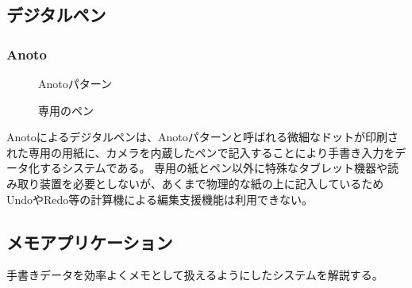 \subsection{デジタルペン}

\subsubsection{Anoto}

\begin{figure}[htbp] \begin{minipage}{0.5\hsize}
                         \begin{center} 
                         \end{center} \caption{Anotoパターン} \label{fig:anoto1}
\end{minipage} \begin{minipage}{0.5\hsize}
                   \begin{center} 
                   \end{center} \caption{専用のペン} \label{fig:anoto2}
\end{minipage}
\end{figure}

Anotoによるデジタルペンは、Anotoパターンと呼ばれる微細なドットが印刷された専用の用紙に、カメラを内蔵したペンで記入することにより手書き入力をデータ化するシステムである。
専用の紙とペン以外に特殊なタブレット機器や読み取り装置を必要としないが、あくまで物理的な紙の上に記入しているためUndoやRedo等の計算機による編集支援機能は利用できない。

\subsection{メモアプリケーション}
手書きデータを効率よくメモとして扱えるようにしたシステムを解説する。

